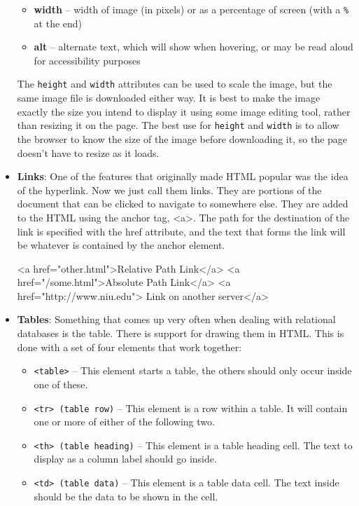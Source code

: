 \documentclass{report}
\begin{document}
\begin{itemize}
\begin{itemize}
            \item \textbf{width} – width of image (in pixels) or as a percentage of screen (with a \texttt{\%} at the end)
            \item \textbf{alt} – alternate text, which will show when hovering, or may be read aloud for accessibility purposes
        \end{itemize}
        The \texttt{height} and \texttt{width} attributes can be used to scale the image, but the same image file is downloaded either way. It is best to make the image exactly the size you intend to display it using some image editing tool, rather than resizing it on the page. The best use for \texttt{height} and \texttt{width} is to allow the browser to know the size of the image before downloading it, so the page doesn’t have to resize as it loads.
    \item \textbf{Links}: One of the features that originally made HTML popular was the idea of the hyperlink. Now we just call them links.
        \bigbreak \noindent 
        They are portions of the document that can be clicked to navigate to somewhere else.
        \bigbreak \noindent 
        They are added to the HTML using the anchor tag, <a>. The path for the destination of the link is specified with the href attribute, and the text that forms the link will be whatever is contained by the anchor element.
        \bigbreak \noindent 
        \begin{htmlcode}
            <a href="other.html">Relative Path Link</a>
            <a href="/some.html">Absolute Path Link</a>
            <a href="http://www.niu.edu"> Link on another server</a>
        \end{htmlcode}
    \item \textbf{Tables}: Something that comes up very often when dealing with relational databases is the table. There is support for drawing them in HTML. This is done with a set of four elements that work together:
        \begin{itemize}
            \item \texttt{<table>} – This element starts a table, the others should only occur inside one of these.
            \item \texttt{<tr> (table row)} – This element is a row within a table. It will contain one or more of either of the following two.
            \item \texttt{<th> (table heading)} – This element is a table heading cell. The text to display as a column label should go inside.
            \item \texttt{<td> (table data)} – This element is a table data cell. The text inside should be the data to be shown in the cell.

\end{itemize}
\end{itemize}
\end{document}
